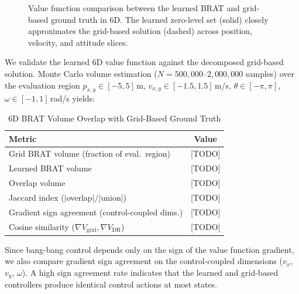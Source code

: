 \documentclass[letterpaper, 10 pt, conference]{ieeeconf}
\begin{document}
   \begin{figure}[t]
      \centering
      \caption{Value function comparison between the learned BRAT and grid-based ground truth in 6D. The learned zero-level set (solid) closely approximates the grid-based solution (dashed) across position, velocity, and attitude slices.}
      \label{fig:value_comparison}
   \end{figure}

We validate the learned 6D value function against the decomposed grid-based solution. Monte Carlo volume estimation ($N = 500{,}000$--$2{,}000{,}000$ samples) over the evaluation region $p_{x,y} \in [-5, 5]$\,m, $v_{x,y} \in [-1.5, 1.5]$\,m/s, $\theta \in [-\pi, \pi]$, $\omega \in [-1, 1]$\,rad/s yields:

\begin{table}[t]
\caption{6D BRAT Volume Overlap with Grid-Based Ground Truth}
\label{tab:volume}
\centering
\begin{tabular}{lc}
\toprule
Metric & Value \\
\midrule
Grid BRAT volume (fraction of eval.\ region) & [TODO] \\
Learned BRAT volume & [TODO] \\
Overlap volume & [TODO] \\
Jaccard index ($|$overlap$|/|$union$|$) & [TODO] \\
Gradient sign agreement (control-coupled dims.) & [TODO] \\
Cosine similarity ($\nabla V_{\mathrm{grid}},\nabla V_{\mathrm{DR}}$) & [TODO] \\
\bottomrule
\end{tabular}
\end{table}

Since bang-bang control depends only on the sign of the value function gradient, we also compare gradient sign agreement on the control-coupled dimensions ($v_x$, $v_y$, $\omega$). A high sign agreement rate indicates that the learned and grid-based controllers produce identical control actions at most states.
\end{document}
